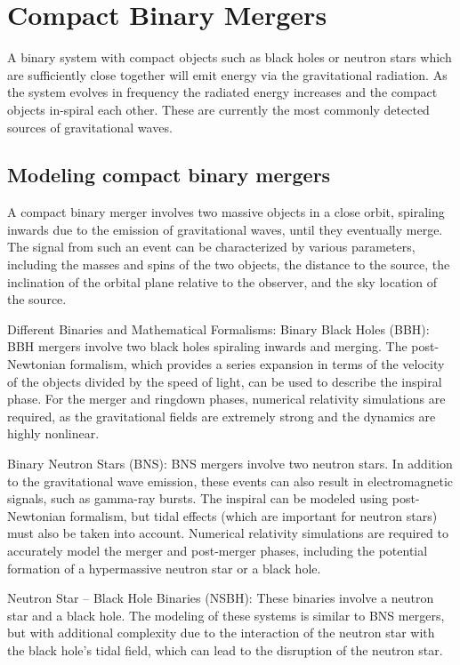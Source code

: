 \section{Compact Binary Mergers}

A binary system with compact objects such as black holes or neutron stars which are sufficiently close together will emit energy via the gravitational radiation. As the system evolves in frequency the radiated energy increases and the compact objects in-spiral each other. 
These are currently the most commonly detected sources of gravitational waves. 

\subsection{Modeling compact binary mergers}

A compact binary merger involves two massive objects in a close orbit, spiraling inwards due to the emission of gravitational waves, until they eventually merge. The signal from such an event can be characterized by various parameters, including the masses and spins of the two objects, the distance to the source, the inclination of the orbital plane relative to the observer, and the sky location of the source.


Different Binaries and Mathematical Formalisms:
Binary Black Holes (BBH): BBH mergers involve two black holes spiraling inwards and merging. The post-Newtonian formalism, which provides a series expansion in terms of the velocity of the objects divided by the speed of light, can be used to describe the inspiral phase. For the merger and ringdown phases, numerical relativity simulations are required, as the gravitational fields are extremely strong and the dynamics are highly nonlinear.

Binary Neutron Stars (BNS): BNS mergers involve two neutron stars. In addition to the gravitational wave emission, these events can also result in electromagnetic signals, such as gamma-ray bursts. The inspiral can be modeled using post-Newtonian formalism, but tidal effects (which are important for neutron stars) must also be taken into account. Numerical relativity simulations are required to accurately model the merger and post-merger phases, including the potential formation of a hypermassive neutron star or a black hole.

Neutron Star – Black Hole Binaries (NSBH): These binaries involve a neutron star and a black hole. The modeling of these systems is similar to BNS mergers, but with additional complexity due to the interaction of the neutron star with the black hole’s tidal field, which can lead to the disruption of the neutron star.

